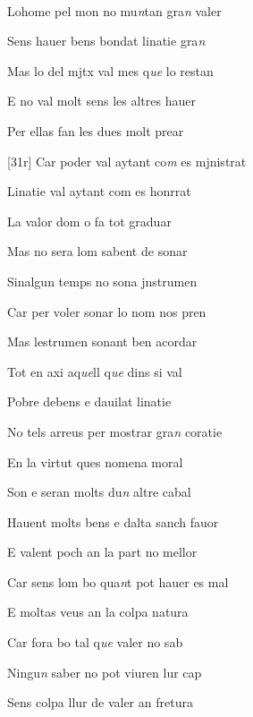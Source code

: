 \documentclass[12pt]{article}
\renewcommand{\espaiAbansEtiquetaPoema}{\vspace{0ex}}
\begin{document}
\begin{estrofa}

\espaiAbansEtiquetaPoema

\\

\end{estrofa}


\begin{estrofa}

 Lohome pel mon no mu\textit{n}tan gra\textit{n }valer

 Sens hauer bens bondat linatie gra\textit{n}

 Mas lo del mjtx val mes q\textit{ue} lo restan

 E no val molt sens les altres hauer

 Per ellas fan les dues molt prear

 [31r] Car poder val aytant co\textit{m} es mjnistrat

 Linatie val aytant com es honrrat

 La valor dom o fa tot graduar

\end{estrofa}



\begin{estrofa}

 Mas no sera lom sabent de sonar

 Sinalgun temps no sona jnstrumen

 Car per voler sonar lo nom nos pren

 Mas lestrumen sonant ben acordar

 Tot en axi aq\textit{ue}ll q\textit{ue} dins si val

 Pobre debens e dauilat linatie

 No tels arreus per mostrar gra\textit{n} coratie

 En la virtut ques nomena moral

\end{estrofa}



\begin{estrofa}

 Son e  seran molts du\textit{n} altre cabal

 Hauent molts bens e dalta sanch fauor

 E valent poch an la part no mellor

 Car sens lom bo qua\textit{n}t pot hauer es mal

 E moltas veus an la colpa natura

 Car fora bo tal q\textit{ue} valer no sab

 Ningu\textit{n} saber no pot viuren lur cap

 Sens colpa llur de valer an fretura

\end{estrofa}
\end{document}
